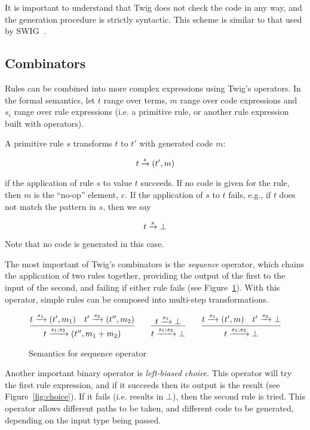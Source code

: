 It is important to understand that Twig does not check the code in any way, and the generation procedure is strictly syntactic. This scheme is similar to that used by SWIG~\cite{swig}.

\subsection{Combinators}

Rules can be combined into more complex expressions using Twig's operators. In the formal semantics, let $t$ range over terms, $m$ range over code expressions and $s_i$ range over rule expressions (i.e. a primitive rule, or another rule expression built with operators).

A primitive rule $s$ transforms $t$ to $t'$ with generated code $m$:

\[
t \xrightarrow{s} (t',m)
\]

if the application of rule $s$ to value $t$ succeeds. If no code is given for the rule, then $m$ is the ``no-op'' element, $e$. If the application of $s$ to $t$ fails, e.g., if $t$ does not match the pattern in $s$, then we say

\[
t \xrightarrow{s} \bot
\]

Note that no code is generated in this case.

The most important of Twig's combinators is the \emph{sequence} operator, which chains the application of two rules together, providing the output of the first to the input of the second, and failing if either rule fails (see Figure~\ref{fig:seq}). With this operator, simple rules can be composed into multi-step transformations.

\begin{figure}[ht]
\label{fig:seq}
\[
\infer
  {t \arr{s_1;s_2} (t'',m_1+m_2)}
  {t \arr{s_1} (t',m_1) \quad t' \arr{s_2} (t'',m_2)}
\qquad
\infer
  {t \arr{s_1;s_2} \bot}
  {t \arr{s_1} \bot}
\qquad
\infer
  {t \arr{s_1;s_2} \bot}
  {t \arr{s_1} (t',m) \quad t' \arr{s_2} \bot}
\]
\caption{Semantics for sequence operator}
\end{figure}

Another important binary operator is \emph{left-biased choice}. This operator will try the first rule expression, and if it succeeds then its output is the result (see Figure~\ref{fig:choice}). If it fails (i.e. results in $\bot$), then the second rule is tried. This operator allows different paths to be taken, and different code to be generated, depending on the input type being passed.

